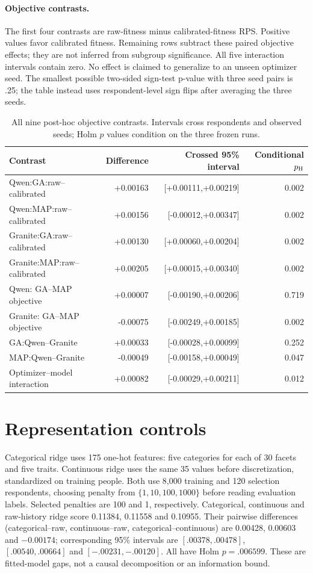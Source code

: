 \documentclass[10pt,twocolumn]{article}
\begin{document}
\paragraph{Objective contrasts.}
The first four contrasts are raw-fitness minus calibrated-fitness RPS.
Positive values favor calibrated fitness. Remaining rows subtract these
paired objective effects; they are not inferred from subgroup significance.
All five interaction intervals contain zero. No effect is claimed to generalize
to an unseen optimizer seed. The smallest possible two-sided sign-test p-value
with three seed pairs is .25; the table instead uses respondent-level sign flips
after averaging the three seeds.
\begin{table}[t]\centering\small
\caption{All nine post-hoc objective contrasts. Intervals cross respondents and observed seeds; Holm $p$ values condition on the three frozen runs.}
\begin{tabular}{@{}lrrr@{}}\toprule
Contrast & Difference & Crossed 95\% interval & Conditional $p_{\rm H}$\\\midrule
Qwen:GA:raw--calibrated & +0.00163 & [+0.00111,+0.00219] & 0.002\\
Qwen:MAP:raw--calibrated & +0.00156 & [-0.00012,+0.00347] & 0.002\\
Granite:GA:raw--calibrated & +0.00130 & [+0.00060,+0.00204] & 0.002\\
Granite:MAP:raw--calibrated & +0.00205 & [+0.00015,+0.00340] & 0.002\\
Qwen: GA--MAP objective & +0.00007 & [-0.00190,+0.00206] & 0.719\\
Granite: GA--MAP objective & -0.00075 & [-0.00249,+0.00185] & 0.002\\
GA:Qwen--Granite & +0.00033 & [-0.00028,+0.00099] & 0.252\\
MAP:Qwen--Granite & -0.00049 & [-0.00158,+0.00049] & 0.047\\
Optimizer--model interaction & +0.00082 & [-0.00029,+0.00211] & 0.012\\
\bottomrule\end{tabular}\end{table}

\section{Representation controls}
Categorical ridge uses 175 one-hot features: five categories for each of
30 facets and five traits. Continuous ridge uses the same 35 values before
discretization, standardized on training people. Both use 8,000 training and
120 selection respondents, choosing penalty from $\{1,10,100,1000\}$ before
reading evaluation labels. Selected penalties are 100 and 1, respectively.
Categorical, continuous and raw-history ridge score 0.11384, 0.11558 and
0.10955. Their pairwise differences (categorical--raw, continuous--raw,
categorical--continuous) are 0.00428, 0.00603 and $-0.00174$; corresponding
95\% intervals are $[.00378,.00478]$, $[.00540,.00664]$ and
$[-.00231,-.00120]$. All have Holm $p=.006599$. These are fitted-model
gaps, not a causal decomposition or an information bound.
\end{document}
